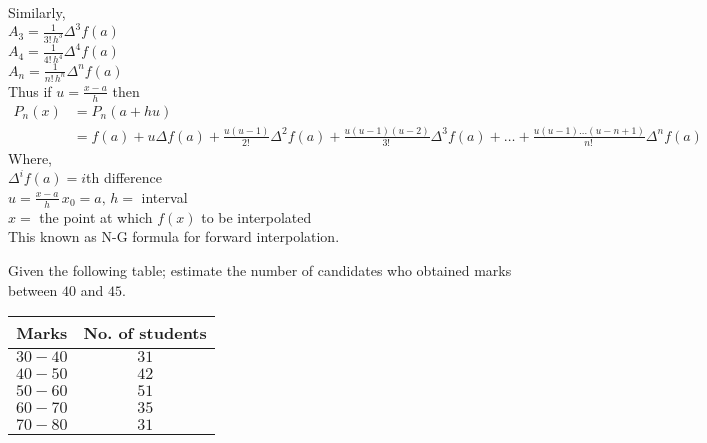 \documentclass[12pt,class=book,crop=false]{standalone}
\begin{document}
\newpage
Similarly,\\
\indent \( A_3 =\frac{1}{3!\, h^3}\Delta^3f(a) \)\\
\indent \( A_4 =\frac{1}{4!\, h^4}\Delta^4f(a) \)\\
\indent \( A_n =\frac{1}{n!\, h^n}\Delta^nf(a) \)\\
Thus if \( u=\frac{x-a}{h} \) then
\[
    \begin{aligned}
        P_n(x) & =P_n(a+hu)                                                                                                                                \\
               & =f(a)+u\Delta f(a)+\frac{u(u-1)}{2!\,}\Delta^2f(a)+\frac{u(u-1)(u-2)}{3!\,}\Delta^3f(a)+\dots+\frac{u(u-1)\dots(u-n+1)}{n!\,}\Delta^nf(a)
    \end{aligned}
\]
Where,\\
\indent \( \Delta^i f(a)=i \)th difference\\
\indent \( u=\frac{x-a}{h}\, x_0=a,\,h= \) interval\\
\indent \( x=\) the point at which \( f(x) \) to be interpolated\\
This known as N-G formula for forward interpolation.
\begin{prob}
    Given the following table; estimate the number of candidates who obtained marks between \( 40 \) and \( 45 \).
    \begin{center}
        \begin{tabular}{cc}
            \toprule
            Marks         & No. of students \\\midrule
            \( 30 - 40 \) & \( 31 \)        \\
            \( 40 - 50 \) & \( 42 \)        \\
            \( 50 - 60 \) & \( 51 \)        \\
            \( 60 - 70 \) & \( 35 \)        \\
            \( 70 - 80 \) & \( 31 \)        \\\bottomrule
        \end{tabular}
    \end{center}
\end{prob}
\end{document}
